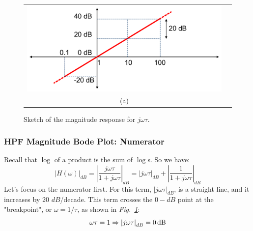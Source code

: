 \newpage
\begin{figure}[t]
\centering
\begin{tabular}{cc}
\includegraphics[width=.55\columnwidth]{mod1_3_9_bode1}\\
(a)\\
\end{tabular}
\caption{Sketch of the magnitude response for $j\omega \tau$.}
\label{fig:hpfnum}
\end{figure}
\subsubsection{HPF Magnitude Bode Plot: Numerator}
Recall that $\log$ of a product is the sum of $\log$s.  So we have:
    \begin{equation}
        {\left| {H(\omega )} \right|_{dB}} = {\left| {\frac{{j\omega \tau }}{{1 + j\omega \tau }}} \right|_{dB}} = {\left| {j\omega \tau } \right|_{dB}} + {\left| {\frac{1}{{1 + j\omega \tau }}} \right|_{dB}}
    \end{equation}
Let's focus on the numerator first.  For this term, $\left|j\omega \tau  \right|_{dB} $, is a straight line, and it increases by $20$ $dB$/decade.  This term crosses the $0-dB$ point at the "breakpoint", or $\omega = 1/\tau$, as shown in \emph{Fig.~\ref{fig:hpfnum}}:
    \begin{equation}
        \omega \tau  = 1 \Rightarrow {\left| {j\omega \tau } \right|_{dB}} = 0\,{\rm{dB}}
    \end{equation}
